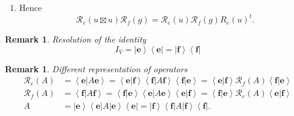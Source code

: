 \documentclass[aps,preprint]{revtex4}%
\newtheorem{remark}[theorem]{Remark}
\begin{document}
\begin{enumerate}
\item Hence
\begin{equation}
\mathcal{R}_{e}\left(  u\boxtimes u\right)  \mathcal{R}_{f}\left(  g\right)
=\mathcal{R}_{e}\left(  u\right)  \mathcal{R}_{f}\left(  g\right)
R_{e}\left(  u\right)  ^{t}.
\end{equation}

\end{enumerate}

\begin{remark}
Resolution of the identity%
\begin{equation}
I_{V}=\left\vert \mathbf{e}\right\rangle \left\langle \mathbf{e}\right\vert
=\left\vert \mathbf{f}\right\rangle \left\langle \mathbf{f}\right\vert
\end{equation}

\end{remark}

\begin{remark}
Different representation of operators
\begin{align}
\mathcal{R}_{e}\left(  A\right)   &  =\left\langle \left.  \mathbf{e}%
\right\vert A\mathbf{e}\right\rangle =\left\langle \left.  \mathbf{e}%
\right\vert \mathbf{f}\right\rangle \left\langle \left.  \mathbf{f}\right\vert
A\mathbf{f}\right\rangle \left\langle \left.  \mathbf{f}\right\vert
\mathbf{e}\right\rangle =\left\langle \left.  \mathbf{e}\right\vert
\mathbf{f}\right\rangle \mathcal{R}_{f}\left(  A\right)  \left\langle \left.
\mathbf{f}\right\vert \mathbf{e}\right\rangle \\
\mathcal{R}_{f}\left(  A\right)   &  =\left\langle \left.  \mathbf{f}%
\right\vert A\mathbf{f}\right\rangle =\left\langle \left.  \mathbf{f}%
\right\vert \mathbf{e}\right\rangle \left\langle \left.  \mathbf{e}\right\vert
A\mathbf{e}\right\rangle \left\langle \left.  \mathbf{e}\right\vert
\mathbf{f}\right\rangle =\left\langle \left.  \mathbf{f}\right\vert
\mathbf{e}\right\rangle \mathcal{R}_{e}\left(  A\right)  \left\langle \left.
\mathbf{e}\right\vert \mathbf{f}\right\rangle \\
A  &  =\left\vert \mathbf{e}\right\rangle \left\langle \mathbf{e}\right\vert
A\left\vert \mathbf{e}\right\rangle \left\langle \mathbf{e}\right\vert
=\left\vert \mathbf{f}\right\rangle \left\langle \mathbf{f}\right\vert
A\left\vert \mathbf{f}\right\rangle \left\langle \mathbf{f}\right\vert .
\end{align}

\end{remark}
\end{document}
